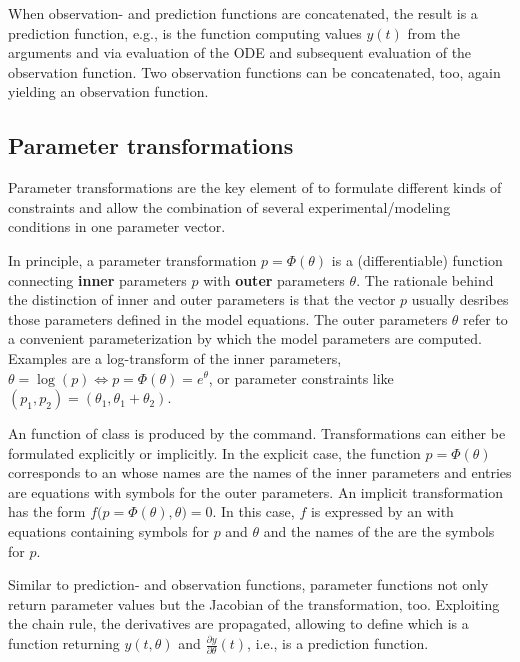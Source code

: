 \documentclass[article]{jss}
\begin{document}
When observation- and prediction functions are concatenated, the result is a prediction function, e.g.,  is the  function computing values $y(t)$ from the arguments  and  via evaluation of the ODE and subsequent evaluation of the observation function. Two observation functions can be concatenated, too, again yielding an observation function.

\subsection{Parameter transformations}

Parameter transformations are the key element of  to formulate different kinds of constraints and allow the combination of several experimental/modeling conditions in one parameter vector.

In principle, a parameter transformation $p = \Phi(\theta)$ is a (differentiable) function connecting \textbf{inner} parameters $p$ with \textbf{outer} parameters $\theta$. The rationale behind the distinction of inner and outer parameters is that the vector $p$ usually desribes those parameters defined in the model equations. The outer parameters $\theta$ refer to a convenient parameterization by which the model parameters are computed. Examples are a log-transform of the inner parameters, $\theta = \log(p) \Leftrightarrow p = \Phi(\theta) = e^{\theta}$, or parameter constraints like $(p_1, p_2) = (\theta_1, \theta_1 + \theta_2)$.

An  function of class  is produced by the  command. Transformations can either be formulated explicitly or implicitly. In the explicit case, the function $p = \Phi(\theta)$ corresponds to an  whose names are the names of the inner parameters and entries are equations with symbols for the outer parameters. An implicit transformation has the form $f\big(p = \Phi(\theta), \theta\big) = 0$. In this case, $f$ is expressed by an  with equations containing symbols for $p$ and $\theta$ and the names of the  are the symbols for $p$.

Similar to prediction- and observation functions, parameter functions not only return parameter values but the Jacobian of the transformation, too. Exploiting the chain rule, the derivatives are propagated, allowing to define  which is a function returning $y(t, \theta)$ and $\frac{\partial y}{\partial \theta}(t)$, i.e.,  is a prediction function.
\end{document}
